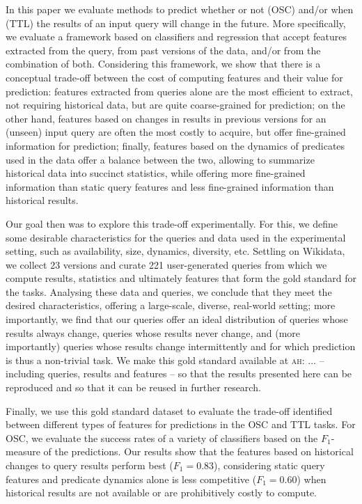 \documentclass[runningheads]{llncs}
\newcommand{\ah}[1]{{\color{blue}\textsc{ah:} #1}}
\begin{document}
In this paper we evaluate methods to predict whether or not (OSC) and/or when (TTL) the results of an input query will change in the future. More specifically, we evaluate a framework based on classifiers and regression that accept features extracted from the query, from past versions of the data, and/or from the combination of both. Considering this framework, we show that there is a conceptual trade-off between the cost of computing features and their value for prediction: features extracted from queries alone are the most efficient to extract, not requiring historical data, but are quite coarse-grained for prediction; on the other hand, features based on changes in results in previous versions for an (unseen) input query are often the most costly to acquire, but offer fine-grained information for prediction; finally, features based on the dynamics of predicates used in the data offer a balance between the two, allowing to summarize historical data into succinct statistics, while offering more fine-grained information than static query features and less fine-grained information than historical results.

Our goal then was to explore this trade-off experimentally. For this, we define some desirable characteristics for the queries and data used in the experimental setting, such as availability, size, dynamics, diversity, etc. Settling on Wikidata, we collect 23 versions and curate 221 user-generated queries from which we compute results, statistics and ultimately features that form the gold standard for the tasks. Analysing these data and queries, we conclude that they meet the desired characteristics, offering a large-scale, diverse, real-world setting; more importantly, we find that our queries offer an ideal distribution of queries whose results always change, queries whose results never change, and (more importantly) queries whose results change intermittently and for which prediction is thus a non-trivial task. We make this gold standard available at \ah{...} -- including queries, results and features -- so that the results presented here can be reproduced and so that it can be reused in further research.

Finally, we use this gold standard dataset to evaluate the trade-off identified between different types of features for predictions in the OSC and TTL tasks. For OSC, we evaluate the success rates of a variety of classifiers based on the $F_1$-measure of the predictions. Our results show that the features based on historical changes to query results perform best ($F_1 = 0.83$), considering static query features and predicate dynamics alone is less competitive ($F_1 =0.60$) when historical results are not available or are prohibitively costly to compute.    
\end{document}
